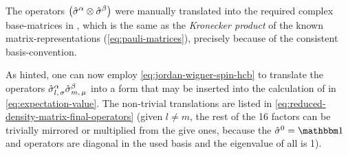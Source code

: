 The operators $\left(\pauli[]{$\alpha$}\otimes\pauli[]{$\beta$}\right)$ were manually translated into the required complex base-matrices in 
, which is the same as the \emph{Kronecker product} \cite{kroneckerProduct} of the known matrix-representations (\autoref{eq:pauli-matrices}), precisely because of the consistent basis-convention.

As hinted, one can now employ \autoref{eq:jordan-wigner-spin-hcb} to translate the operators $\pauli[l,\,\sigma]{$\alpha$}\pauli[m,\,\mu]{$\beta$}$ into a form that may be inserted into the calculation of  in \autoref{eq:expectation-value}. The non-trivial translations are listed in \autoref{eq:reduced-density-matrix-final-operators} (given $l\neq m$, the rest of the 16 factors can be trivially mirrored or multiplied from the give ones, because the $\pauli[]{0} = \one[]$ and  operators are diagonal in the used basis and the eigenvalue of all \one[] is 1).


